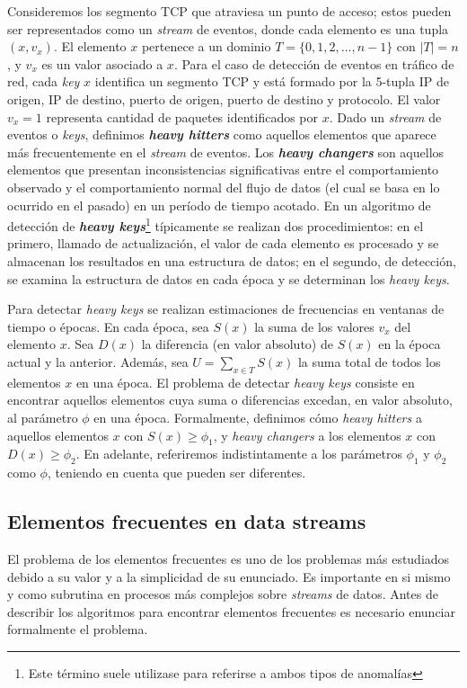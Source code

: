 \documentclass[a4paper,10pt, oneside]{article}
\begin{document}
Consideremos los segmento TCP que atraviesa un punto de acceso; estos pueden ser representados como un \textit{stream} de eventos, donde cada elemento es una tupla $(x, v_x)$. El elemento $x$ pertenece a un dominio $T=\{0,1,2, \dots, n-1\}$ con $|T|=n$, y $v_x$ es un valor asociado a $x$. Para el caso de detección de eventos en tráfico de red, cada \textit{key} $x$ identifica un segmento TCP y está formado por la 5-tupla IP de origen, IP de destino, puerto de origen, puerto de destino y protocolo. El valor $v_x=1$ representa cantidad de paquetes identificados por $x$. Dado un \textit{stream} de eventos o \textit{keys}, definimos \textbf{\textit{heavy hitters}} como aquellos elementos que aparece más frecuentemente en el \textit{stream} de eventos. Los \textbf{\textit{heavy changers}} son aquellos elementos que presentan inconsistencias significativas entre el comportamiento observado y el comportamiento normal del flujo de datos (el cual se basa en lo ocurrido en el pasado) en un período de tiempo acotado\cite{Tong:2016:HTS:2927964.2927977}. 
En un algoritmo de detección de \textbf{\textit{heavy keys}}\footnote{Este término suele utilizase para referirse a ambos tipos de anomalías} típicamente se realizan dos procedimientos: en el primero, llamado de actualización, el valor de cada elemento es procesado y se almacenan los resultados en una estructura de datos; en el segundo, de detección, se examina la estructura de datos en cada época y se determinan los \textit{heavy keys}.

Para detectar \textit{heavy keys} se realizan estimaciones de frecuencias en ventanas de tiempo o épocas. En cada época, sea $S(x)$ la suma de los valores $v_x$ del elemento $x$. Sea $D(x)$ la diferencia (en valor absoluto) de $S(x)$ en la época actual y la anterior. Además, sea $U=\sum_{x \in T} S(x)$ la suma total de todos los elementos $x$ en una época. El problema de detectar \textit{heavy keys} consiste en encontrar aquellos elementos cuya suma o diferencias excedan, en valor absoluto, al parámetro $\phi$ en una época. Formalmente, definimos cómo \textit{heavy hitters} a aquellos elementos $x$ con $S(x) \geq \phi_1$, y \textit{heavy changers} a los elementos $x$ con $D(x) \geq \phi_2$. En adelante, referiremos indistintamente a los parámetros $\phi_1$ y $\phi_2$ como $\phi$, teniendo en cuenta que pueden ser diferentes.


\subsection{Elementos frecuentes en data streams} \label{elementos_frecuentes}
El problema de los elementos frecuentes es uno de los problemas más estudiados debido a su valor y a la simplicidad de su enunciado. Es importante en si mismo y como subrutina en procesos más complejos sobre \textit{streams} de datos. Antes de describir los algoritmos para encontrar elementos frecuentes es necesario enunciar formalmente el problema.
\end{document}

